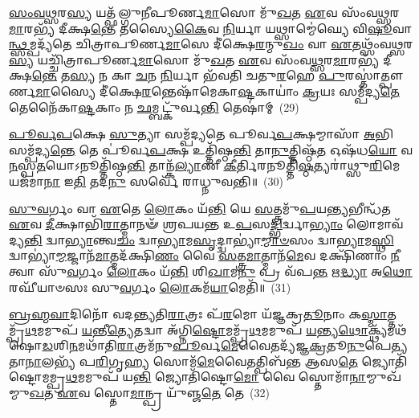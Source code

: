 \-\ul{𑌸𑌂}\-\-\ul{𑌵}\-\-\ul{𑌥𑍍𑌸}\-𑌰\-\ul{𑌸𑍍𑌯} 𑌯𑌤𑍍𑌫᳴𑌲𑍍𑌗𑍁𑌨𑍀𑌪𑍂𑌰𑍍𑌣\-\ul{𑌮𑌾}\-𑌸𑍋 𑌮𑍁᳴\-\ul{𑌖}\-𑌤 \ul{𑌏}\-𑌵 𑌸𑌂᳴𑌵\-\ul{𑌥𑍍𑌸}\-𑌰\-\ul{𑌮𑌾}\-𑌰𑌭𑍍𑌯᳴ 𑌦𑍀𑌕𑍍𑌷\-\ul{𑌨𑍍𑌤𑍇} 𑌤𑌸𑍍𑌯𑍈\-\ul{𑌕𑍈}\-𑌵 \ul{𑌨𑌿}\-𑌰𑍍𑌯𑌾 𑌯𑌥𑍍𑌸𑌾𑌮𑍍𑌮𑍇॑𑌘𑍍𑌯𑍇 𑌵𑌿\-\ul{𑌷𑍂}\-𑌵𑌾\-\ul{𑌨𑍍𑌥𑍍𑌸}\-𑌮𑍍𑌪𑌦𑍍𑌯᳴𑌤𑍇 𑌚𑌿𑌤𑍍𑌰𑌾𑌪𑍂𑌰𑍍𑌣\-\ul{𑌮𑌾}\-𑌸𑍇 𑌦𑍀॑𑌕𑍍𑌷𑍇\-\ul{𑌰}\-𑌨𑍍𑌮𑍁\-\ul{𑌖𑌂} 𑌵𑌾 \ul{𑌏}\-𑌤𑌥𑍍𑌸𑌂᳴𑌵\-\ul{𑌥𑍍𑌸}\-𑌰\-\ul{𑌸𑍍𑌯} 𑌯𑌚𑍍𑌚𑌿᳴𑌤𑍍𑌰𑌾𑌪𑍂𑌰𑍍𑌣\-\ul{𑌮𑌾}\-𑌸𑍋 𑌮𑍁᳴\-\ul{𑌖}\-𑌤 \ul{𑌏}\-𑌵 𑌸𑌂᳴𑌵\-\ul{𑌥𑍍𑌸}\-𑌰\-\ul{𑌮𑌾}\-𑌰𑌭𑍍𑌯᳴ 𑌦𑍀𑌕𑍍𑌷\-\ul{𑌨𑍍𑌤𑍇} 𑌤\-\ul{𑌸𑍍𑌯} 𑌨 𑌕𑌾 \ul{𑌚}\-𑌨 \ul{𑌨𑌿}\-𑌰𑍍𑌯𑌾 𑌭᳴𑌵𑌤𑌿 𑌚𑌤𑍁\-\ul{𑌰}\-𑌹𑍇 \ul{𑌪𑍁}\-𑌰𑌸𑍍𑌤𑌾॑𑌤𑍍𑌪𑍗𑌰𑍍𑌣\-\ul{𑌮𑌾}\-𑌸𑍍𑌯𑍈 𑌦𑍀॑𑌕𑍍𑌷𑍇\-\ul{𑌰}\-𑌨𑍍𑌤𑍇𑌷𑌾᳴𑌮𑍇𑌕𑌾\-\ul{𑌷𑍍𑌟}\-𑌕𑌾𑌯𑌾𑌂॑ \ul{𑌕𑍍𑌰}\-𑌯𑌃 𑌸𑌮𑍍𑌪᳴𑌦𑍍𑌯\-\ul{𑌤𑍇} 𑌤𑍇𑌨𑍈᳴𑌕𑌾\-\ul{𑌷𑍍𑌟}\-𑌕𑌾𑌂 𑌨 \ul{𑌛}\-𑌮𑍍𑌬𑌟𑍍𑌕𑍁᳴𑌰𑍍𑌵\-\ul{𑌨𑍍𑌤𑌿} 𑌤𑍇𑌷𑌾॑𑌮𑍍~(29)

\-\ul{𑌪𑍂}\-\-\ul{𑌰𑍍𑌵}\-\-\ul{𑌪}\-𑌕𑍍𑌷𑍇 \ul{𑌸𑍁}\-𑌤𑍍𑌯𑌾 𑌸𑌮𑍍𑌪᳴𑌦𑍍𑌯𑌤𑍇 𑌪𑍂𑌰𑍍𑌵\-\ul{𑌪}\-𑌕𑍍𑌷𑌮𑍍𑌮𑌾𑌸𑌾᳴ \ul{𑌅}\-𑌭𑌿 𑌸𑌮𑍍𑌪᳴𑌦𑍍𑌯\-\ul{𑌨𑍍𑌤𑍇} 𑌤𑍇 𑌪𑍂॑𑌰𑍍𑌵\-\ul{𑌪}\-𑌕𑍍𑌷 𑌉𑌤𑍍𑌤𑌿᳴𑌷𑍍𑌠\-\ul{𑌨𑍍𑌤𑌿} 𑌤𑌾\-\ul{𑌨𑍁}\-𑌤𑍍𑌤𑌿𑌷𑍍𑌠᳴\-\ul{𑌤} 𑌓𑌷᳴𑌧\-\ul{𑌯𑍋} 𑌵\-\ul{𑌨}\-𑌸𑍍𑌪\-\ul{𑌤}\-𑌯𑍋\-𑌽𑌨𑍂𑌤𑍍𑌤𑌿᳴𑌷𑍍𑌠\-\ul{𑌨𑍍𑌤𑌿} 𑌤𑌾𑌨𑍍𑌕᳴\-\ul{𑌲𑍍𑌯𑌾}\-𑌣𑍀 \ul{𑌕𑍀}\-𑌰𑍍𑌤𑌿𑌰𑌨𑍂𑌤𑍍𑌤𑌿᳴\-\ul{𑌷𑍍𑌠}\-𑌤𑍍𑌯𑌰𑌾॑𑌥𑍍𑌸𑍁\-\ul{𑌰𑌿}\-𑌮𑍇 𑌯𑌜᳴𑌮𑌾\-\ul{𑌨𑌾} 𑌇\-\ul{𑌤𑌿} 𑌤𑌦\-\ul{𑌨𑍁} 𑌸𑌰𑍍𑌵𑍇᳴ 𑌰𑌾𑌧𑍍𑌨𑍁𑌵𑌨𑍍𑌤𑌿॥~(30)

{\anuvakamend[{\-\ul{𑌏}\-𑌤\-\ul{𑌚𑍍𑌛}\-𑌮𑍍𑌬𑌟𑍍𑌕𑍁᳴𑌰𑍍𑌵\-\ul{𑌨𑍍𑌤𑌿} 𑌤𑍇\-\ul{𑌷𑌾}\-𑌞𑍍𑌚𑌤𑍁᳴𑌸𑍍𑌤𑍍𑌰𑌿𑍞𑌶𑌚𑍍𑌚}]}%

\-\ul{𑌸𑍁}\-\-\ul{𑌵}\-𑌰𑍍𑌗𑌂 𑌵𑌾 \ul{𑌏}\-𑌤𑍇 \ul{𑌲𑍋}\-𑌕𑌂 𑌯᳴\-\ul{𑌨𑍍𑌤𑌿} 𑌯𑍇 \ul{𑌸}\-𑌤𑍍𑌤𑍍𑌰𑌮𑍁᳴\-\ul{𑌪}\-𑌯\-\ul{𑌨𑍍𑌤𑍍𑌯}\-𑌭𑍀𑌨𑍍𑌧᳴𑌤 \ul{𑌏}\-𑌵 \ul{𑌦𑍀}\-𑌕𑍍𑌷𑌾𑌭𑌿᳴\-\ul{𑌰𑌾}\-𑌤𑍍𑌮𑌾𑌨𑍟᳴ 𑌶𑍍𑌰𑌪𑌯𑌨𑍍𑌤 𑌉\-\ul{𑌪}\-𑌸\-\ul{𑌦𑍍𑌭𑌿}\-𑌰𑍍𑌦𑍍𑌵𑌾\-\ul{𑌭𑍍𑌯𑌾𑌂} 𑌲𑍋𑌮𑌾𑌵᳴ 𑌦𑍍𑌯\-\ul{𑌨𑍍𑌤𑌿} 𑌦𑍍𑌵𑌾\-\ul{𑌭𑍍𑌯𑌾}\-𑌨𑍍𑌤𑍍𑌵\-\ul{𑌚𑌂} 𑌦𑍍𑌵𑌾\-\ul{𑌭𑍍𑌯𑌾}\-𑌮\-\ul{𑌸𑍃}\-𑌦𑍍𑌦𑍍𑌵𑌾𑌭𑍍𑌯𑌾॑\-\ul{𑌮𑍍𑌮𑌾}\-\-\ul{𑍞}\-𑌸𑌂 𑌦𑍍𑌵𑌾\-\ul{𑌭𑍍𑌯𑌾}\-𑌮\-\ul{𑌸𑍍𑌥𑌿} 𑌦𑍍𑌵𑌾𑌭𑍍𑌯𑌾॑\-\ul{𑌮𑍍𑌮}\-𑌜𑍍𑌜𑌾𑌨᳴\-\ul{𑌮𑌾}\-𑌤𑍍𑌮𑌦᳴𑌕𑍍𑌷𑌿\-\ul{𑌣𑌂} 𑌵𑍈 \ul{𑌸}\-𑌤𑍍𑌤𑍍𑌰\-\ul{𑌮𑌾}\-𑌤𑍍𑌮𑌾𑌨᳴\-\ul{𑌮𑍇}\-𑌵 𑌦𑌕𑍍𑌷𑌿᳴𑌣𑌾𑌂 \ul{𑌨𑍀}\-𑌤𑍍𑌵𑌾 𑌸𑍁᳴\-\ul{𑌵}\-𑌰𑍍𑌗𑌂 \ul{𑌲𑍋}\-𑌕𑌂 𑌯᳴\-\ul{𑌨𑍍𑌤𑌿} 𑌶𑌿\-\ul{𑌖𑌾}\-𑌮\-\ul{𑌨𑍁} 𑌪𑍍𑌰 𑌵᳴𑌪\-\ul{𑌨𑍍𑌤} 𑌋\-\ul{𑌦𑍍𑌧𑍍𑌯𑌾} 𑌅\-\ul{𑌥𑍋} 𑌰𑌘𑍀᳴𑌯𑌾𑍞𑌸𑌃 𑌸𑍁\-\ul{𑌵}\-𑌰𑍍𑌗𑌂 \ul{𑌲𑍋}\-𑌕𑌮᳴\-\ul{𑌯𑌾}\-𑌮𑍇𑌤𑌿᳴॥~(31)

{\anuvakamend[{\-\ul{𑌸𑍁}\-\-\ul{𑌵}\-𑌰𑍍𑌗𑌮𑍍𑌪᳴\-\ul{𑌞𑍍𑌚𑌾}\-𑌶𑌤𑍍}]}%

\-\ul{𑌬𑍍𑌰}\-\-\ul{𑌹𑍍𑌮}\-\-\ul{𑌵𑌾}\-𑌦𑌿𑌨𑍋᳴ 𑌵𑌦𑌨𑍍𑌤𑍍𑌯𑌤𑌿\-\ul{𑌰𑌾}\-𑌤𑍍𑌰𑌃 𑌪᳴\-\ul{𑌰}\-𑌮𑍋 𑌯᳴𑌜𑍍𑌞𑌕𑍍𑌰\-\ul{𑌤𑍂}\-𑌨𑌾𑌂 𑌕\-\ul{𑌸𑍍𑌮𑌾}\-𑌤𑍍𑌤𑌮𑍍𑌪𑍍𑌰᳴\-\ul{𑌥}\-𑌮𑌮𑍁𑌪᳴ \ul{𑌯}\-𑌨𑍍𑌤𑍀\-\ul{𑌤𑍍𑌯𑍇}\-𑌤𑌦𑍍𑌵𑌾 𑌅᳴𑌗𑍍𑌨𑌿\-\ul{𑌷𑍍𑌟𑍋}\-𑌮𑌮𑍍𑌪𑍍𑌰᳴\-\ul{𑌥}\-𑌮𑌮𑍁𑌪᳴ \ul{𑌯}\-𑌨𑍍𑌤𑍍𑌯\-\ul{𑌥𑍋}\-𑌕𑍍𑌥𑍍𑌯᳴𑌮𑌥᳴ 𑌷𑍋\-\ul{𑌡}\-𑌶𑌿\-\ul{𑌨}\-𑌮𑌥𑌾᳴𑌤𑌿\-\ul{𑌰𑌾}\-𑌤𑍍𑌰𑌮᳴𑌨𑍁\-\ul{𑌪𑍂}\-𑌰𑍍𑌵\-\ul{𑌮𑍇}\-𑌵𑍈𑌤𑌦𑍍𑌯᳴𑌜𑍍𑌞\-\ul{𑌕𑍍𑌰}\-𑌤𑍂\-\ul{𑌨𑍁}\-𑌪𑍇\-\ul{𑌤𑍍𑌯} 𑌤𑌾\-\ul{𑌨𑌾}\-𑌲𑌭𑍍𑌯᳴ 𑌪\-\ul{𑌰𑌿}\-𑌗𑍃\-\ul{𑌹𑍍𑌯} 𑌸𑍋𑌮᳴\-\ul{𑌮𑍇}\-𑌵𑍈𑌤𑌤𑍍𑌪𑌿𑌬᳴𑌨𑍍𑌤 𑌆𑌸\-\ul{𑌤𑍇} 𑌜𑍍𑌯𑍋𑌤𑌿᳴𑌷𑍍𑌟𑍋𑌮𑌮𑍍𑌪𑍍𑌰\-\ul{𑌥}\-𑌮𑌮𑍁𑌪᳴ 𑌯\-\ul{𑌨𑍍𑌤𑌿} 𑌜𑍍𑌯𑍋𑌤𑌿᳴𑌷𑍍𑌟𑍋\-\ul{𑌮𑍋} 𑌵𑍈 𑌸𑍍𑌤𑍋𑌮𑌾᳴\-\ul{𑌨𑌾}\-𑌮𑍍𑌮𑍁𑌖᳴𑌮𑍍𑌮𑍁\-\ul{𑌖}\-𑌤 \ul{𑌏}\-𑌵 𑌸𑍍𑌤𑍋\-\ul{𑌮𑌾}\-𑌨𑍍𑌪𑍍𑌰 𑌯𑍁᳴𑌞𑍍𑌜\-\ul{𑌤𑍇} 𑌤𑍇~(32)

